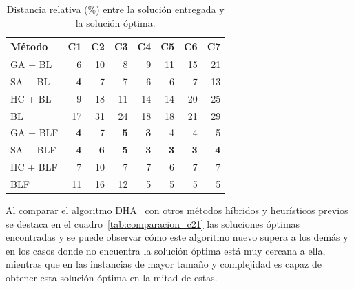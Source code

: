 \documentclass[letter, 10pt]{article}
\begin{document}
\begin{table}[H]
    \centering
    \begin{tabular}{|l|rrrrrrr|}
    \hline
    M\'etodo & \multicolumn{1}{l}{C1} & \multicolumn{1}{l}{C2} & \multicolumn{1}{l}{C3} & \multicolumn{1}{l}{C4} & \multicolumn{1}{l}{C5} & \multicolumn{1}{l}{C6} & \multicolumn{1}{l|}{C7} \\ \hline
    GA + BL & 6 & 10 & 8 & 9 & 11 & 15 & 21 \\ \hline
    SA + BL & \textbf{4} & 7 & 7 & 6 & 6 & 7 & 13 \\ \hline
    HC + BL & 9 & 18 & 11 & 14 & 14 & 20 & 25 \\ \hline
    BL & 17 & 31 & 24 & 18 & 18 & 21 & 29 \\ \hline
    GA + BLF & \textbf{4} & 7 & \textbf{5} & \textbf{3} & 4 & 4 & 5 \\ \hline
    SA + BLF & \textbf{4} & \textbf{6} & \textbf{5} & \textbf{3} & \textbf{3} & \textbf{3} & \textbf{4} \\ \hline
    HC + BLF & 7 & 10 & 7 & 7 & 6 & 7 & 7 \\ \hline
    BLF & 11 & 16 & 12 & 5 & 5 & 5 & 5 \\ \hline
    \end{tabular}
    \caption{Distancia relativa (\%) entre la soluci\'on entregada y la soluci\'on \'optima.}
    \label{tab:comparacion_c7}
\end{table}

Al comparar el algoritmo DHA~\cite{he2013heuristics} con otros m\'etodos h\'ibridos y heur\'isticos previos se destaca en el cuadro~\ref{tab:comparacion_c21} las soluciones \'optimas encontradas y se puede observar c\'omo este algoritmo nuevo supera a los dem\'as y en los casos donde no encuentra la soluci\'on \'optima est\'a muy cercana a ella, mientras que en las instancias de mayor tama\~no y complejidad es capaz de obtener esta soluci\'on \'optima en la mitad de estas.
\end{document}
